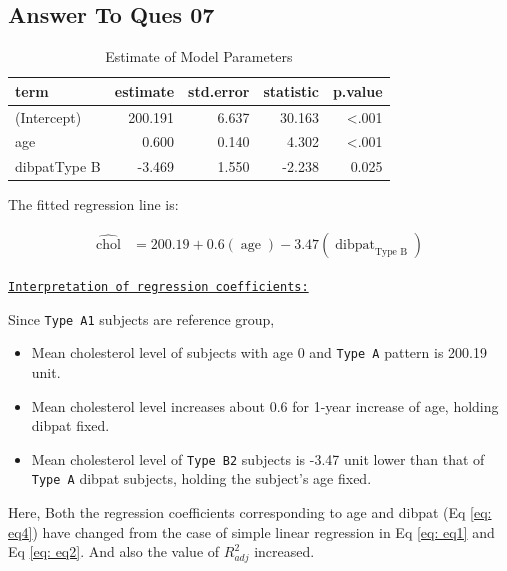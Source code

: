 \documentclass[
  12pt,
  oneside]{article}
\providecommand{\tightlist}{%
  \setlength{\itemsep}{0pt}\setlength{\parskip}{0pt}}
\begin{document}
\clearpage

\hypertarget{answer-to-ques-07}{%
\subsection{Answer To Ques 07}\label{answer-to-ques-07}}

\begin{table}[H]

\caption{\label{tab:Table-09}Estimate of Model Parameters}
\centering
\begin{tabular}[t]{lrrrr}
\toprule
term & estimate & std.error & statistic & p.value\\
\midrule
(Intercept) & 200.191 & 6.637 & 30.163 & <.001\\
age & 0.600 & 0.140 & 4.302 & <.001\\
dibpatType B & -3.469 & 1.550 & -2.238 & 0.025\\
\bottomrule
\end{tabular}
\end{table}

The fitted regression line is:

\begin{equation}
\label{eq: eq4}
\begin{aligned}
\operatorname{\widehat{chol}} &= 200.19 + 0.6(\operatorname{age}) - 3.47(\operatorname{dibpat}_{\operatorname{Type\ B}})
\end{aligned}
\end{equation}

\underline{\texttt{Interpretation of regression coefficients:}}

Since \texttt{Type\ A1} subjects are reference group,

\begin{itemize}
\tightlist
\item
  Mean cholesterol level of subjects with age 0 and \texttt{Type\ A} pattern is 200.19 unit.
\item
  Mean cholesterol level increases about 0.6 for 1-year increase of age, holding dibpat fixed.
\item
  Mean cholesterol level of \texttt{Type\ B2} subjects is -3.47 unit lower than that of \texttt{Type\ A} dibpat subjects, holding the subject's age fixed.
\end{itemize}

Here, Both the regression coefficients corresponding to age and dibpat (Eq \ref{eq: eq4}) have changed from the case of simple linear regression in Eq \ref{eq: eq1} and Eq \ref{eq: eq2}. And also the value of \(R^2_{adj}\) increased.
\end{document}
